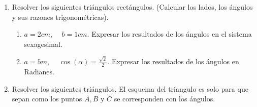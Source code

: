 \documentclass[a4paper,11pt,spanish,sans]{exam}
\begin{document}
	\begin{enumerate}
		
		\item Resolver los siguientes triángulos rectángulos. (Calcular los lados, los ángulos y sus razones trigonométricas). \label{rectangulos}\\
		
		\begin{minipage}{0.45\linewidth}
			
			
		\end{minipage}
		\begin{minipage}{0.55\linewidth}
			\begin{enumerate}
				\item $a=2cm$, $\quad b=1cm$. Expresar los resultados de los ángulos en el sistema sexagesimal.
				\item $a=5m$, $\quad \cos(\alpha)=\frac{\sqrt{2}}{2}$. Expresar los resultados de los ángulos en Radianes.
			\end{enumerate}
		\end{minipage}
		
		\item Resolver los siguientes triángulos. El esquema del triangulo es solo para que sepan como los puntos $A,B$ y $C$ se corresponden con los ángulos. \label{obtusos}
		

\end{enumerate}
\end{document}
